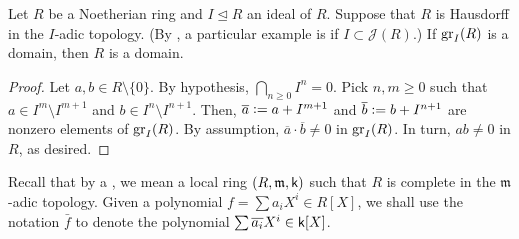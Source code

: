 \begin{prop}
	Let $R$ be a Noetherian ring and $I \unlhd R$ an ideal of $R$. Suppose that $R$ is Hausdorff in the $I$-adic topology. (By , a particular example is if $I \subset \mathcal{J}(R)$.) If $\operatorname{gr}_{I}(R)$ is a domain, then $R$ is a domain.
\end{prop}
\begin{proof} 
	Let $a, b \in R \setminus \{0\}$. By hypothesis, $\bigcap_{n \ge 0} I^{n} = 0$. Pick $n, m \ge 0$ such that $a \in I^{m} \setminus I^{m + 1}$ and $b \in I^{n} \setminus I^{n + 1}$. \newline
	Then, $\overline{a} \vcentcolon= a + I^{m + 1}$ and $\overline{b} \vcentcolon= b + I^{n + 1}$ are nonzero elements of $\operatorname{gr}_{I}(R)$. By assumption, $\overline{a} \cdot \overline{b} \neq 0$ in $\operatorname{gr}_{I}(R)$. In turn, $ab \neq 0$ in $R$, as desired.
\end{proof}

Recall that by a , we mean a local ring $(R, \mathfrak{m}, \mathsf{k})$ such that $R$ is complete in the $\mathfrak{m}$-adic topology. \newline
Given a polynomial $f = \sum a_{i} X^{i} \in R[X]$, we shall use the notation $\bar{f}$ to denote the polynomial $\sum \overline{a_{i}} X^{i} \in \mathsf{k}[X]$.

